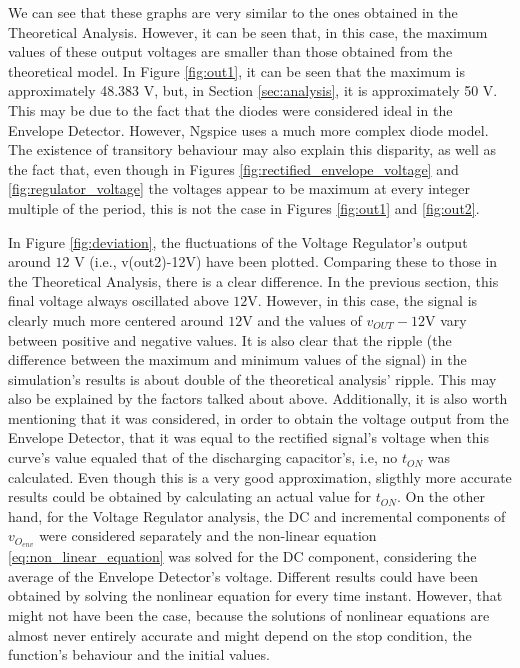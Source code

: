 We can see that these graphs are very similar to the ones obtained in the Theoretical Analysis. However, it can be seen that, in this case, the maximum values of these output voltages are smaller than those obtained from the theoretical model. In Figure \ref{fig:out1}, it can be seen that the maximum is approximately 48.383 V, but, in Section \ref{sec:analysis}, it is approximately 50 V. This may be due to the fact that the diodes were considered ideal in the Envelope Detector. However, Ngspice uses a much more complex diode model. The existence of transitory behaviour may also explain this disparity, as well as the fact that, even though in Figures \ref{fig:rectified_envelope_voltage} and \ref{fig:regulator_voltage} the voltages appear to be maximum at every integer multiple of the period, this is not the case in Figures \ref{fig:out1} and \ref{fig:out2}.
\par
In Figure \ref{fig:deviation}, the fluctuations of the Voltage Regulator's output around $12$ V (i.e., v(out2)-12V) have been plotted. Comparing these to those in the Theoretical Analysis, there is a clear difference. In the previous section, this final voltage always oscillated above $12$V. However, in this case, the signal is clearly much more centered around $12$V and the values of $v_{OUT}-12$V vary between positive and negative values. It is also clear that the ripple (the difference between the maximum and minimum values of the signal) in the simulation's results is about double of the theoretical analysis' ripple. This may also be explained by the factors talked about above. Additionally, it is also worth mentioning that it was considered, in order to obtain the voltage output from the Envelope Detector, that it was equal to the rectified signal's voltage when this curve's value equaled that of the discharging capacitor's, i.e, no $t_{ON}$ was calculated. Even though this is a very good approximation, sligthly more accurate results could be obtained by calculating an actual value for $t_{ON}$. On the other hand, for the Voltage Regulator analysis, the DC and incremental components of $v_{O_{env}}$ were considered separately and the non-linear equation \ref{eq:non_linear_equation} was solved for the DC component, considering the average of the Envelope Detector's voltage. Different results could have been obtained by solving the nonlinear equation for every time instant. However, that might not have been the case, because the solutions of nonlinear equations are almost never entirely accurate and might depend on the stop condition, the function's behaviour and the initial values. 

